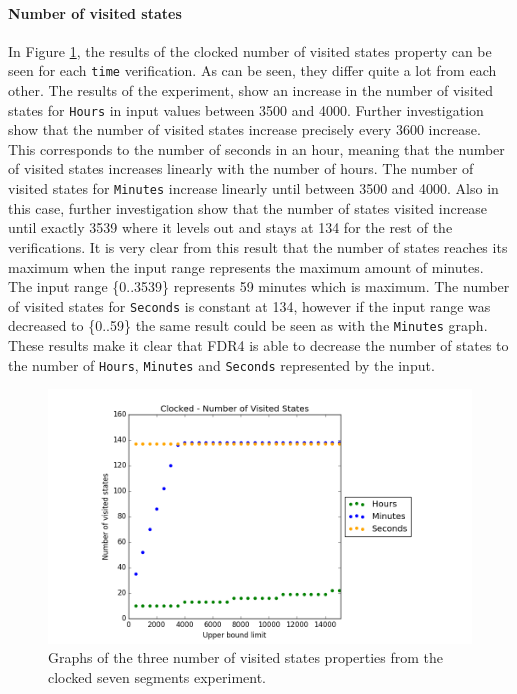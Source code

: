 \paragraph{Number of visited states}
In Figure \ref{fig:clocked_states}, the results of the clocked number of visited states property can be seen for each \texttt{time} verification. As can be seen, they differ quite a lot from each other.
The results of the experiment, show an increase in the number of visited states for \texttt{Hours} in input values between 3500 and 4000. Further investigation show that the number of visited states increase precisely every 3600 increase.
This corresponds to the number of seconds in an hour, meaning that the number of visited states increases linearly with the number of hours.
The number of visited states for \texttt{Minutes} increase linearly until between 3500 and 4000. Also in this case, further investigation show that the number of states visited increase until exactly 3539 where it levels out and stays at 134 for the rest of the verifications.
It is very clear from this result that the number of states reaches its maximum when the input range represents the maximum amount of minutes. The input range \{0..3539\} represents 59 minutes which is maximum. The number of visited states for \texttt{Seconds} is constant at 134, however if the input range was decreased to \{0..59\} the same result could be seen as with the \texttt{Minutes} graph. These results make it clear that FDR4 is able to decrease the number of states to the number of \texttt{Hours}, \texttt{Minutes} and \texttt{Seconds} represented by the input.
\begin{figure}
    \centering
    \includegraphics[scale=0.6]{./figures/plots/clocked_states.png}
\caption{Graphs of the three number of visited states properties from the clocked seven segments experiment.}
\label{fig:clocked_states}
\end{figure}
